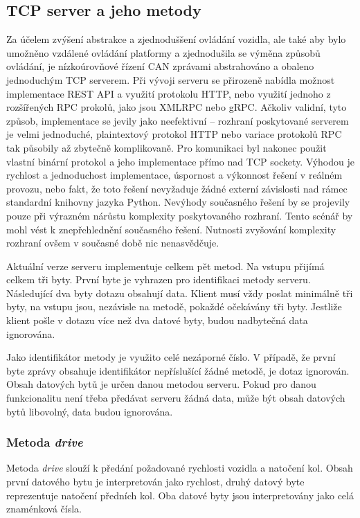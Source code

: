 \documentclass[czech,bachelor,dept460,male,cpp,cpdeclaration]{diploma}
\begin{document}
\subsection{TCP server a jeho metody}

Za účelem zvýšení abstrakce a zjednoduššení ovládání vozidla, ale také aby bylo umožněno vzdálené ovládání platformy
a zjednodušila se výměna způsobů ovládání, je nízkoúrovňové řízení CAN zprávami abstrahováno a obaleno jednoduchým TCP serverem.
Při vývoji serveru se přirozeně nabídla možnost implementace REST API a využití protokolu HTTP, nebo využití jednoho z rozšířených
RPC prokolů, jako jsou XMLRPC nebo gRPC. Ačkoliv validní, tyto způsob, implementace se jevily jako neefektivní -- rozhraní 
poskytované serverem je velmi jednoduché, plaintextový protokol HTTP nebo variace protokolů RPC tak působily až zbytečně 
komplikovaně. Pro komunikaci byl nakonec použit vlastní binární protokol a jeho implementace přímo nad TCP sockety. 
Výhodou je rychlost a jednoduchost implementace, úspornost a výkonnost řešení v reálném provozu, nebo fakt, že toto řešení 
nevyžaduje žádné externí závislosti nad rámec standardní knihovny jazyka Python. Nevýhody současného řešení by se projevily 
pouze při výrazném nárůstu komplexity poskytovaného rozhraní. Tento scénář by mohl vést k znepřehlednění současného řešení. 
Nutnosti zvyšování komplexity rozhraní ovšem v současné době nic nenasvědčuje. 

Aktuální verze serveru implementuje celkem pět metod. Na vstupu přijímá celkem tři byty. První byte je vyhrazen pro identifikaci 
metody serveru. Následující dva byty dotazu obsahují data. Klient musí vždy poslat minimálně tři byty, na vstupu jsou, nezávisle
na metodě, pokaždé očekávány tři byty. Jestliže klient pošle v dotazu více než dva datové byty, budou nadbytečná data ignorována.

Jako identifikátor metody je využito celé nezáporné číslo. V případě, že první byte zprávy obsahuje identifikátor nepříslušící 
žádné metodě, je dotaz ignorován. Obsah datových bytů je určen danou metodou serveru. Pokud pro danou funkcionalitu není třeba 
předávat serveru žádná data, může být obsah datových bytů libovolný, data budou ignorována. 

\subsubsection{Metoda \emph{drive}}
Metoda \emph{drive} slouží k předání požadované rychlosti vozidla a natočení kol. Obsah první datového bytu je interpretován jako 
rychlost, druhý datový byte reprezentuje natočení předních kol. Oba datové byty jsou interpretovány jako celá znaménková čísla. 
\end{document}
